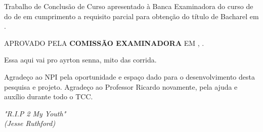 \documentclass[12pt,openright,oneside,a4paper,english,french,spanish,brazil]{unifil}
\begin{document}
\begin{folhadeaprovacao}
	\begin{center}
		\ABNTEXchapterfont\textbf{\MakeTextUppercase{\imprimirautor}}
		\vspace*{2cm}
		\begin{center}
			\ABNTEXchapterfont\large\textbf{\MakeTextUppercase{\imprimirtitulo}}
		\end{center}
		\vspace*{2cm}
		Trabalho de Conclusão de Curso apresentado à Banca Examinadora do curso de \imprimirpreambulo do \imprimirinstituicao de \imprimirlocal em cumprimento a requisito parcial para obtenção do título de Bacharel em \imprimirpreambulo.
		\par
		\vspace*{.5in}
		\hspace{.6\textwidth}
		\begin{minipage}{.6\textwidth}
			\begin{center}
\MakeTextUppercase{Aprovado pela \textbf{COMISSÃO EXAMINADORA} em \imprimirlocal, \imprimirdata.}
			\end{center}
		\end{minipage}
			\vspace*{\fill}
	\end{center}
\end{folhadeaprovacao}


\begin{epigrafe}
\vspace*{\fill}
\begin{flushright}
Essa aqui vai pro ayrton senna, mito das corrida.
\end{flushright}
\end{epigrafe} 


\begin{agradecimentos}

Agradeço ao NPI pela oportunidade e espaço dado para o desenvolvimento desta pesquisa e projeto.
Agradeço ao Professor Ricardo novamente, pela ajuda e auxílio durante todo o TCC.
\end{agradecimentos}


\begin{epigrafe}
\vspace*{\fill}
\begin{flushright}
\textit{"R.I.P 2 My Youth" \\
(Jesse Ruthford)}
\end{flushright}
\end{epigrafe}
\end{document}
